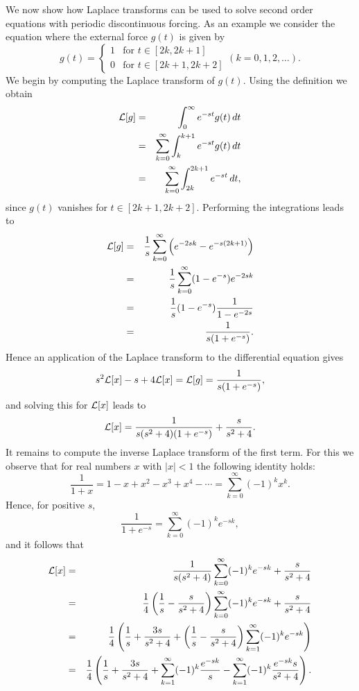 We now show how Laplace transforms can be used to solve second order
equations with periodic discontinuous forcing.  As an example we consider
the equation  where the external force $g(t)$ is
given by
\begin{equation}
g(t) =  
\left\{\begin{array}{cl} 1 & \mbox{for $t \in [2k,2k+1]$} \\ 
		0 & \mbox{for $t \in [2k+1,2k+2]$} \end{array} \right.
(k=0,1,2,\ldots).
\end{equation}
We begin by computing the Laplace transform of $g(t)$. Using the 
definition we obtain
\begin{eqnarray*}
{\cal L}[g] & = & \int_0^\infty e^{-st} g(t)\, dt\\
&=& \sum_{k=0}^\infty \int_k^{k+1} e^{-st} g(t)\, dt\\
&=& \sum_{k=0}^\infty \int_{2k}^{2k+1} e^{-st}\, dt,
\end{eqnarray*}
since $g(t)$ vanishes for $t \in [2k+1,2k+2]$. Performing the
integrations leads to
\begin{eqnarray*}
{\cal L}[g] & = & \frac{1}{s}\sum_{k=0}^\infty \left(e^{-2sk}-e^{-s(2k+1)}\right)\\
&=& \frac{1}{s}\sum_{k=0}^\infty (1-e^{-s})e^{-2sk}\\
&=& \frac{1}{s} (1-e^{-s}) \frac{1}{1-e^{-2s}}\\
&=& \frac{1}{s(1+e^{-s})}.
\end{eqnarray*}
Hence an application of the Laplace transform to the differential equation 
 gives
\[
s^2{\cal L}[x]-s + 4{\cal L}[x] = {\cal L}[g] = \frac{1}{s(1+e^{-s})},
\]
and solving this for ${\cal L}[x]$ leads to
\[
{\cal L}[x] = \frac{1}{s(s^2 +4)(1+e^{-s})} + \frac{s}{s^2 +4}.
\]
It remains to compute the inverse Laplace transform 
of the first term.  For this
we observe that for real numbers $x$ with $|x|<1$ the following identity holds:
\[
\frac{1}{1+x} = 1-x+x^2-x^3+x^4-\cdots = \sum_{k=0}^\infty (-1)^k x^k.
\]
Hence, for positive $s$,
\[
\frac{1}{1+e^{-s}} = \sum_{k=0}^\infty (-1)^k e^{-sk},
\]
and it follows that
\begin{eqnarray*}
{\cal L}[x] &=&\frac{1}{s(s^2 +4)}\sum_{k=0}^\infty (-1)^k e^{-sk} + \frac{s}{s^2 +4}\\
&=& \frac{1}{4}\left(\frac{1}{s}-\frac{s}{s^2+4}\right)
    \sum_{k=0}^\infty (-1)^k e^{-sk} + \frac{s}{s^2 +4}\\
&=& \frac{1}{4}\left(\frac{1}{s}+\frac{3s}{s^2+4}+
   \left(\frac{1}{s}-\frac{s}{s^2+4}\right) \sum_{k=1}^\infty (-1)^k e^{-sk}\right)\\
&=& \frac{1}{4}\left(\frac{1}{s}+\frac{3s}{s^2+4}+
   \sum_{k=1}^\infty (-1)^k \frac{e^{-sk}}{s}-
   \sum_{k=1}^\infty (-1)^k \frac{e^{-sk}s}{s^2+4}\right).
\end{eqnarray*} 
